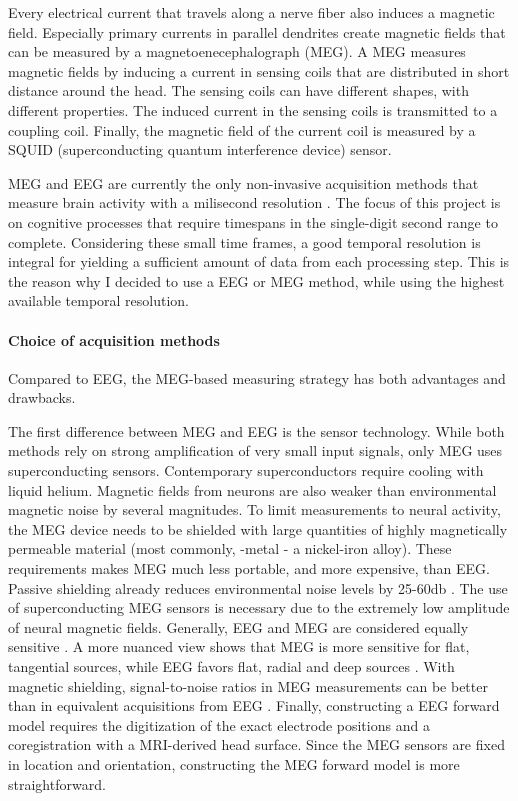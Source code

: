 Every electrical current that travels along a nerve fiber also induces a magnetic field.
Especially primary currents in parallel dendrites create magnetic fields that can be measured by a magnetoenecephalograph (MEG).
A MEG measures magnetic fields by inducing a current in sensing coils that are distributed in short distance around the head.
The sensing coils can have different shapes, with different properties.
The induced current in the sensing coils is transmitted to a coupling coil.
Finally, the magnetic field of the current coil is measured by a SQUID (superconducting quantum interference device) sensor.

MEG and EEG are currently the only non-invasive acquisition methods that measure brain activity with a milisecond resolution \cite{1.5.MEG.a}\cite{1.5.MEG.b}\cite{1.5.MEG.c}.
The focus of this project is on cognitive processes that require timespans in the single-digit second range to complete.
Considering these small time frames, a good temporal resolution is integral for yielding a sufficient amount of data from each processing step.
This is the reason why I decided to use a EEG or MEG method, while using the highest available temporal resolution.

\paragraph{Choice of acquisition methods}
Compared to EEG, the MEG-based measuring strategy has both advantages and drawbacks.


The first difference between MEG and EEG is the sensor technology.
While both methods rely on strong amplification of very small input signals, only MEG uses superconducting sensors.
Contemporary superconductors require cooling with liquid helium.
Magnetic fields from neurons are also weaker than environmental magnetic noise by several magnitudes.
To limit measurements to neural activity, the MEG device needs to be shielded with large quantities of highly magnetically permeable material (most commonly, \si{\micro}-metal - a nickel-iron alloy).
These requirements makes MEG much less portable, and more expensive, than EEG.
Passive shielding already reduces environmental noise levels by 25-60db \cite{1.5.SNR}.
The use of superconducting MEG sensors is necessary due to the extremely low amplitude of neural magnetic fields.
Generally, EEG and MEG are considered equally sensitive \cite{1.5.MEG.a}\cite{1.5.MEG.c}.
A more nuanced view shows that MEG is more sensitive for flat, tangential sources, while EEG favors flat, radial and deep sources \cite{1.5.sensitivity}.
With magnetic shielding, signal-to-noise ratios in MEG measurements can be better than in equivalent acquisitions from EEG \cite{1.5.SNR}.
Finally, constructing a EEG forward model requires the digitization of the exact electrode positions and a coregistration with a MRI-derived head surface.
Since the MEG sensors are fixed in location and orientation, constructing the MEG forward model is more straightforward.


